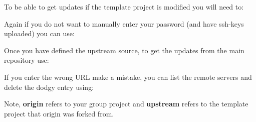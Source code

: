 To be able to get updates if the template project is modified you will
need to:

\begin{Shaded}
\begin{Highlighting}[]
\NormalTok{$ }
\NormalTok{$ }
\end{Highlighting}
\end{Shaded}

Again if you do not want to manually enter your password (and have
ssh-keys uploaded) you can use:
%
\begin{Shaded}
\begin{Highlighting}[]
\NormalTok{$ }
\NormalTok{$ }
\end{Highlighting}
\end{Shaded}

Once you have defined the upstream source, to get the updates from the
main repository use:
%
\begin{Shaded}
\begin{Highlighting}[]
\NormalTok{$ }
\end{Highlighting}
\end{Shaded}

If you enter the wrong URL make a mistake, you can list the remote
servers and delete the dodgy entry using:

\begin{Shaded}
\begin{Highlighting}[]
\NormalTok{$ }
\NormalTok{$ }
\end{Highlighting}
\end{Shaded}

Note, \textbf{origin} refers to your group project and \textbf{upstream}
refers to the template project that origin was forked from.

